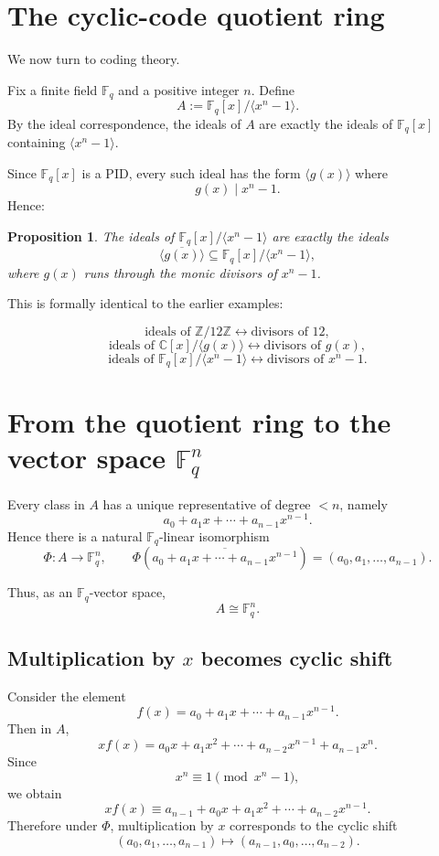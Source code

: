 \documentclass[11pt]{article}
\newtheorem{proposition}[theorem]{Proposition}
\theoremstyle{definition}
\newcommand{\Z}{\mathbb{Z}}
\newcommand{\C}{\mathbb{C}}
\newcommand{\F}{\mathbb{F}}
\newcommand{\ideal}[1]{\langle #1\rangle}
\newcommand{\ol}[1]{\overline{#1}}
\begin{document}
	\section{The cyclic-code quotient ring}
	
	We now turn to coding theory.
	
	Fix a finite field $\F_q$ and a positive integer $n$. Define
	\[
	A:=\F_q[x]/\ideal{x^n-1}.
	\]
	By the ideal correspondence, the ideals of $A$ are exactly the ideals of $\F_q[x]$ containing $\ideal{x^n-1}$.
	
	Since $\F_q[x]$ is a PID, every such ideal has the form $\ideal{g(x)}$ where
	\[
	g(x)\mid x^n-1.
	\]
	Hence:
	
	\begin{proposition}\label{prop:ideals-of-cyclic-ring}
		The ideals of $\F_q[x]/\ideal{x^n-1}$ are exactly the ideals
		\[
		\ideal{\ol{g(x)}}
		\subseteq
		\F_q[x]/\ideal{x^n-1},
		\]
		where $g(x)$ runs through the monic divisors of $x^n-1$.
	\end{proposition}
	
	This is formally identical to the earlier examples:
	
	\[
	\text{ideals of }\Z/12\Z
	\leftrightarrow
	\text{divisors of }12,
	\]
	\[
	\text{ideals of }\C[x]/\ideal{g(x)}
	\leftrightarrow
	\text{divisors of }g(x),
	\]
	\[
	\text{ideals of }\F_q[x]/\ideal{x^n-1}
	\leftrightarrow
	\text{divisors of }x^n-1.
	\]
	
	\section{From the quotient ring to the vector space $\F_q^n$}
	
	Every class in $A$ has a unique representative of degree $<n$, namely
	\[
	a_0+a_1x+\cdots+a_{n-1}x^{n-1}.
	\]
	Hence there is a natural $\F_q$-linear isomorphism
	\[
	\Phi:A\longrightarrow \F_q^n,
	\qquad
	\Phi\!\left(\ol{a_0+a_1x+\cdots+a_{n-1}x^{n-1}}\right)
	=
	(a_0,a_1,\dots,a_{n-1}).
	\]
	
	Thus, as an $\F_q$-vector space,
	\[
	A\cong \F_q^n.
	\]
	
	\subsection{Multiplication by $x$ becomes cyclic shift}
	
	Consider the element
	\[
	f(x)=a_0+a_1x+\cdots+a_{n-1}x^{n-1}.
	\]
	Then in $A$,
	\[
	x f(x)
	=
	a_0x+a_1x^2+\cdots+a_{n-2}x^{n-1}+a_{n-1}x^n.
	\]
	Since
	\[
	x^n\equiv 1 \pmod{x^n-1},
	\]
	we obtain
	\[
	x f(x)\equiv a_{n-1}+a_0x+a_1x^2+\cdots+a_{n-2}x^{n-1}.
	\]
	Therefore under $\Phi$, multiplication by $x$ corresponds to the cyclic shift
	\[
	(a_0,a_1,\dots,a_{n-1})
	\longmapsto
	(a_{n-1},a_0,\dots,a_{n-2}).
	\]
	
\end{document}
